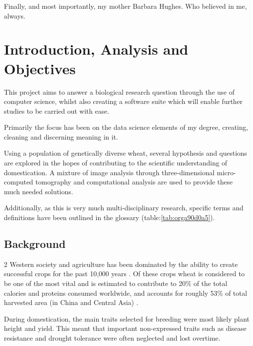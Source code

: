 \documentclass[11pt]{report}
\begin{document}
\vspace{1cm}

Finally, and most importantly, my mother Barbara Hughes. Who believed in me, always.



  \clearpage
  \tableofcontents
  \clearpage
  \listoftables
  \clearpage
  \listoffigures
  \clearpage
  \listofmyequations
  \clearpage
  \listoflistings
  \clearpage

\chapter{Introduction, Analysis and Objectives}
\label{sec:org25f4fd4}

This project aims to answer a biological research question through the use of computer science, whilst also creating a software suite which will enable further studies to be carried out with ease.

Primarily the focus has been on the data science elements of my degree, creating, cleaning and discerning meaning in it.

Using a population of genetically diverse wheat, several hypothesis and questions are explored in the hopes of contributing to the scientific understanding of domestication. A mixture of image analysis through three-dimensional micro-computed tomography and computational analysis are used to provide these much needed solutions.

Additionally, as this is very much multi-disciplinary research, specific terms and definitions have been outlined in the glossary (table:\ref{tab:orga90d0a5}).

\section{Background}
\label{sec:orgcdddf9c}
2
   Western society and agriculture has been dominated by the ability to create successful crops for the past 10,000 years \cite{Ozkan2002}. Of these crops wheat is considered to be one of the most vital and is estimated to contribute to 20\% of the total calories and proteins consumed worldwide, and accounts for roughly 53\% of total harvested area (in China and Central Asia) \cite{Shiferaw2013}.

During domestication, the main traits selected for breeding were most likely plant height and yield. This meant that important non-expressed traits such as disease resistance and drought tolerance were often neglected and lost overtime.
\end{document}
